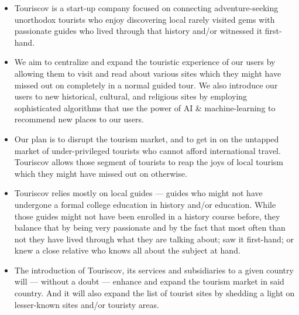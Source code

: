 \documentclass[12pt]{article}
\begin{document}
\begin{itemize}
    \item Touriscov is a start-up company focused on connecting adventure-seeking unorthodox tourists who enjoy discovering local rarely visited gems with passionate guides who lived through that history and/or witnessed it first-hand.
    \item We aim to centralize and expand the touristic experience of our users by allowing them to visit and read about various sites which they might have missed out on completely in a normal guided tour. We also introduce our users to new historical, cultural, and religious sites by employing sophisticated algorithms that use the power of AI \& machine-learning to recommend new places to our users.
    \item Our plan is to disrupt the tourism market, and to get in on the untapped market of under-privileged tourists who cannot afford international travel. Touriscov allows those segment of tourists to reap the joys of local tourism which they might have missed out on otherwise.
    \item Touriscov relies mostly on local guides --- guides who might not have undergone a formal college education in history and/or education. While those guides might not have been enrolled in a history course before, they balance that by being very passionate and by the fact that most often than not they have lived through what they are talking about; saw it first-hand; or knew a close relative who knows all about the subject at hand. 
    \item The introduction of Touriscov, its services and subsidiaries to a given country will --- without a doubt --- enhance and expand the tourism market in said country. And it will also expand the list of tourist sites by shedding a light on lesser-known sites and/or touristy areas. 
\end{itemize}


\newpage
{}
\pagestyle{fancy}
\end{document}

